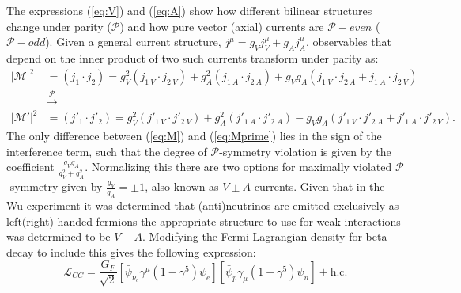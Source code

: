 The expressions (\ref{eq:V}) and (\ref{eq:A}) show how different bilinear structures change under parity ($\mathcal{P}$) and how pure vector (axial) currents are $\mathcal{P}-even$ ($\mathcal{P}-odd$). Given a general current structure, $j^\mu = g_V j_{V}^\mu + g_A j_{A}^\mu$, observables that depend on the inner product of two such currents transform under parity as:
\begin{align}
  |\mathcal{M}|^2 &= (j_{1} \cdot j_{2}) = g_V^2 (j_{1~V} \cdot j_{2~V}) + g_A^2 (j_{1~A} \cdot j_{2~A}) + g_V g_A (j_{1~V} \cdot j_{2~A} + j_{1~A} \cdot j_{2~V})\label{eq:M} \\ \nonumber
  &\xrightarrow{\mathcal{P}} \\
  |\mathcal{M}'|^2 &= (j'_{1} \cdot j'_{2}) = g_V^2 (j'_{1~V} \cdot j'_{2~V}) + g_A^2 (j'_{1~A} \cdot j'_{2~A}) - g_V g_A (j'_{1~V} \cdot j'_{2~A} + j'_{1~A} \cdot j'_{2~V}).\label{eq:Mprime}
\end{align}
The only difference between (\ref{eq:M}) and (\ref{eq:Mprime}) lies in the sign of the interference term, such that the degree of $\mathcal{P}$-symmetry violation is given by the coefficient $\frac{g_V g_A}{g_V^2 + g_A^2}$. Normalizing this there are two options for maximally violated $\mathcal{P}$-symmetry given by $\frac{g_V}{g_A} = \pm 1$, also known as $V\pm A$ currents. Given that in the Wu experiment it was determined that (anti)neutrinos are emitted exclusively as left(right)-handed fermions the appropriate structure to use for weak interactions was determined to be $V-A$. Modifying the Fermi Lagrangian density for beta decay to include this gives the following expression:
\begin{equation}
  \mathcal{L}_{CC}=\frac{G_{F}}{\sqrt{2}}\left[\bar{\psi}_{\nu_{e}}\gamma^{\mu}(1-\gamma^{5})\psi_{e}\right]\left[\bar{\psi}_{p}\gamma_{\mu}(1-\gamma^{5})\psi_{n}\right]+\text{h.c.} \label{eq:VALag}
\end{equation}
